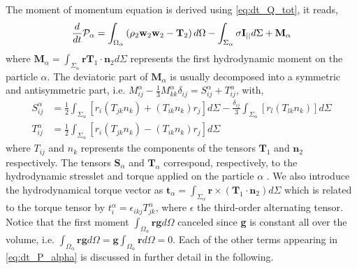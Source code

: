 The moment of momentum equation is derived using \ref{eq:dt_Q_tot}, it reads, 
\begin{equation}
    \frac{d}{d t} \mathcal{P}_\alpha
    = \int_{\Omega_\alpha} \left(
        \rho_2  \textbf{w}_2 \textbf{w}_2 
        - \mathbf{T}_2
    \right) d\Omega
    - \int_{\Sigma_\alpha} 
        \sigma \textbf{I}_{||}
    d\Sigma
    + \textbf{M}_\alpha
    \label{eq:dt_P_alpha}
\end{equation}
where $\textbf{M}_\alpha = \int_{\Sigma_\alpha} \textbf{r}\mathbf{T}_1\cdot \textbf{n}_2d\Sigma $ represents the first hydrodynamic moment on the particle $\alpha$.
The deviatoric part of $\textbf{M}_\alpha$ is usually decomposed into a symmetric and antisymmetric part, i.e. $M^\alpha_{ij} - \frac{1}{3}M^\alpha_{kk}\delta_{ij} = S^\alpha_{ij}+T^\alpha_{ij}$, with,
\begin{align}
    \label{eq:M_decomposition}
    S^\alpha_{ij} 
    &= \frac{1}{2}  \int_{\Sigma_\alpha} \left[
        r_i(T_{jk}n_k)
        + (T_{ik}n_k)r_j
        \right]d\Sigma
        - \frac{\delta_{ij}}{3}\int_{\Sigma_\alpha} \left[
            r_l(T_{lk}n_k)
    \right]d\Sigma\\
    T^\alpha_{ij}
    &= \frac{1}{2}  \int_{\Sigma_\alpha} \left[
        r_i(T_{jk}n_k)
        - (T_{ik}n_k)r_j
    \right]d\Sigma \nonumber
\end{align}
where $T_{ij}$ and $n_k$ represents the components of the tensors $\textbf{T}_1$ and $\textbf{n}_2$ respectively. 
The tensors $\textbf{S}_\alpha$ and $\textbf{T}_\alpha$ correspond, respectively, to the hydrodynamic stresslet and torque applied on the particle $\alpha$ \citep{guazzelli2011,kim2013microhydrodynamics}. 
We also introduce the hydrodynamical torque vector as $\textbf{t}_\alpha = \int_{\Sigma_\alpha} \textbf{r} \times (\mathbf{T}_1\cdot \textbf{n}_2) d\Sigma$ which is related to the torque tensor by $t^\alpha_i = \epsilon_{ikj} T^\alpha_{jk}$, where $\epsilon$ the third-order alternating tensor. 
Notice that the first moment  $\int_{\Omega_\alpha} \textbf{rg} d\Omega$ canceled since \textbf{g} is constant all over the volume, i.e. $\int_{\Omega_\alpha} \textbf{rg} d\Omega =\textbf{g}\int_{\Omega_\alpha} \textbf{r} d\Omega=0$. 
Each of the other terms appearing in \ref{eq:dt_P_alpha} is discussed in further detail in the following.

